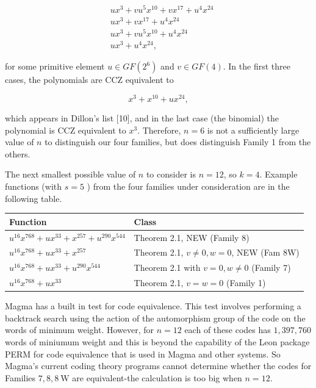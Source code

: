 \documentclass[10pt]{article}
\begin{document}
$$
\begin{aligned}
& u x^{3}+v u^{5} x^{10}+v x^{17}+u^{4} x^{24} \\
& u x^{3}+v x^{17}+u^{4} x^{24} \\
& u x^{3}+v u^{5} x^{10}+u^{4} x^{24} \\
& u x^{3}+u^{4} x^{24},
\end{aligned}
$$

for some primitive element $u \in G F\left(2^{6}\right)$ and $v \in G F(4)$. In the first three cases, the polynomials are CCZ equivalent to

$$
x^{3}+x^{10}+u x^{24},
$$

which appears in Dillon's list [10], and in the last case (the binomial) the polynomial is CCZ equivalent to $x^{3}$. Therefore, $n=6$ is not a sufficiently large value of $n$ to distinguish our four families, but does distinguish Family 1 from the others.

The next smallest possible value of $n$ to consider is $n=12$, so $k=4$. Example functions (with $s=5$ ) from the four families under consideration are in the following table.

\begin{center}
\begin{tabular}{ll}
\hline
Function & Class \\
\hline
$u^{16} x^{768}+u x^{33}+x^{257}+u^{290} x^{544}$ & Theorem 2.1, NEW (Family 8) \\
$u^{16} x^{768}+u x^{33}+x^{257}$ & Theorem 2.1, $v \neq 0, w=0$, NEW (Fam 8W) \\
$u^{16} x^{768}+u x^{33}+u^{290} x^{544}$ & Theorem 2.1 with $v=0, w \neq 0$ (Family 7) \\
$u^{16} x^{768}+u x^{33}$ & Theorem 2.1, $v=w=0$ (Family 1) \\
\hline
\end{tabular}
\end{center}

Magma has a built in test for code equivalence. This test involves performing a backtrack search using the action of the automorphism group of the code on the words of minimum weight. However, for $n=12$ each of these codes has $1,397,760$ words of miniumum weight and this is beyond the capability of the Leon package PERM for code equivalence that is used in Magma and other systems. So Magma's current coding theory programs cannot determine whether the codes for Families $7,8,8 \mathrm{~W}$ are equivalent-the calculation is too big when $n=12$.
\end{document}
